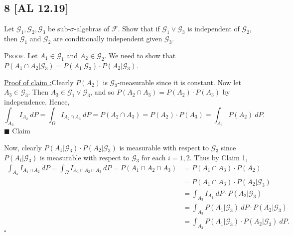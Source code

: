 \documentclass[12pt]{article}
\newcounter{ProofCounter}
\newcounter{ClaimCounter}[ProofCounter]
\newenvironment{Proof}{\stepcounter{ProofCounter}\textsc{Proof.}}{\hfill$\square$}
\newenvironment{claim}[1]{\vspace{1mm}\stepcounter{ClaimCounter}\par\noindent\underline{\bf Claim \theClaimCounter:}\space#1}{}
\newenvironment{claimproof}[1]{\par\noindent\underline{Proof of claim \theClaimCounter:}\space#1}{\hfill $\blacksquare$ Claim \theClaimCounter}
\begin{document}
\subsection*{8 [AL 12.19]}
\begin{tcolorbox}
  Let $\mathcal{G}_1, \mathcal{G}_2, \mathcal{G}_3$ be sub-$\sigma$-algebras of $\mathcal{F}$. Show that if $\mathcal{G}_1 \vee \mathcal{G}_3$ is
  independent of $\mathcal{G}_2$, then $\mathcal{G}_1$ and $\mathcal{G}_2$ are conditionally independent given $\mathcal{G}_3$.
\end{tcolorbox}
\begin{Proof}
  Let $A_1 \in \mathcal{G}_1$ and $A_2 \in \mathcal{G}_2$. We need to show that $P(A_1 \cap A_2 | \mathcal{G}_3) = P(A_1 | \mathcal{G}_3) \cdot P(A_2 |
  \mathcal{G}_3)$.

  \begin{claimproof}
    Clearly $P(A_2)$ is $\mathcal{G}_3$-measurable since it is constant.
    Now let $A_3 \in \mathcal{G}_3$. Then $A_3 \in \mathcal{G}_1 \vee \mathcal{G}_3$, and so $P(A_2 \cap A_3) = P(A_2)\cdot P(A_3)$ by independence.
    Hence,
    \[ \int_{A_3}I_{A_2}\ dP = \int_{\Omega}I_{A_2 \cap A_3}\ dP = P(A_2 \cap A_3) = P(A_2)\cdot P(A_3) = \int_{A_3}P(A_2)\ dP. \]
  \end{claimproof}

  Now, clearly $P(A_1|\mathcal{G}_3)\cdot P(A_2|\mathcal{G}_3)$ is measurable with respect to $\mathcal{G}_3$ since $P(A_i | \mathcal{G}_3)$ is 
  measurable with respect to $\mathcal{G}_3$ for each $i = 1,2$. Thus by Claim 1,
  \begin{align*}
    \int_{A_3}I_{A_1\cap A_2}\ dP = \int_{\Omega}I_{A_1\cap A_2\cap A_3}\ dP = P(A_1 \cap A_2 \cap A_3) & = P(A_1\cap A_3)\cdot P(A_2)  \\
    & = P(A_1\cap A_3) \cdot P(A_2|\mathcal{G}_3) \\
    & = \int_{A_3}I_{A_1}\ dP \cdot P(A_2|\mathcal{G}_3) \\
    & = \int_{A_3}P(A_1|\mathcal{G}_3)\ dP \cdot P(A_2 | \mathcal{G}_3) \\
    & = \int_{A_3}P(A_1|\mathcal{G}_3)\cdot P(A_2|\mathcal{G}_3)\ dP.
  \end{align*}
\end{Proof}
\end{document}
